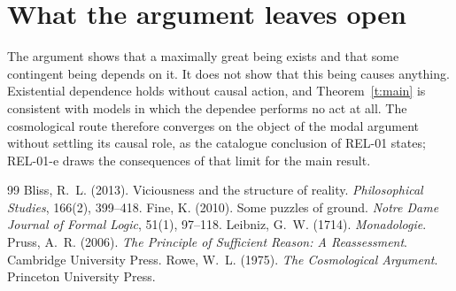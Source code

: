 \documentclass{situationist-preprint}
\begin{document}
\section{What the argument leaves open}

The argument shows that a maximally great being exists and that some contingent being depends on it. It does not show that this being causes anything. Existential dependence holds without causal action, and Theorem~\ref{t:main} is consistent with models in which the dependee performs no act at all. The cosmological route therefore converges on the object of the modal argument without settling its causal role, as the catalogue conclusion of REL-01 states; REL-01-e draws the consequences of that limit for the main result.

\begin{thebibliography}{99}\small
{} Bliss, R.~L. (2013). Viciousness and the structure of reality. \emph{Philosophical Studies}, 166(2), 399--418.
 Fine, K. (2010). Some puzzles of ground. \emph{Notre Dame Journal of Formal Logic}, 51(1), 97--118.
 Leibniz, G.~W. (1714). \emph{Monadologie}.
 Pruss, A.~R. (2006). \emph{The Principle of Sufficient Reason: A Reassessment}. Cambridge University Press.
 Rowe, W.~L. (1975). \emph{The Cosmological Argument}. Princeton University Press.
\end{thebibliography}
\end{document}
